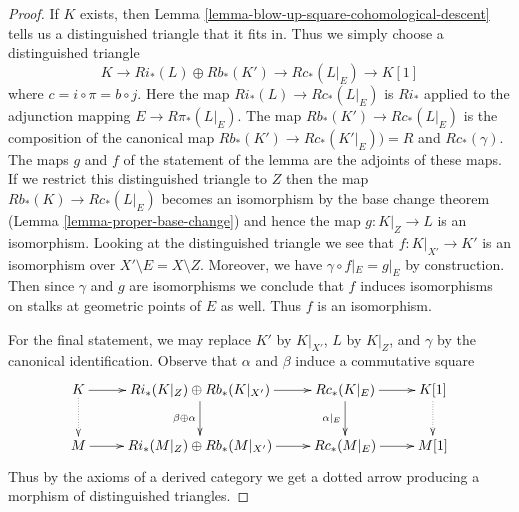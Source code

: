 \documentclass[10pt,a4paper]{amsart}
\theoremstyle{plain}
\theoremstyle{definition}
\theoremstyle{remark}
\numberwithin{equation}{subsection}
\begin{document}
\begin{proof}
If $K$ exists, then Lemma \ref{lemma-blow-up-square-cohomological-descent}
tells us a distinguished triangle that it fits in. Thus we simply choose
a distinguished triangle
$$
K \to Ri_*(L) \oplus Rb_*(K') \to Rc_*(L|_E) \to K[1]
$$
where $c = i \circ \pi = b \circ j$. Here the map $Ri_*(L) \to Rc_*(L|_E)$
is $Ri_*$ applied to the adjunction mapping $E \to R\pi_*(L|_E)$.
The map $Rb_*(K') \to Rc_*(L|_E)$ is the composition of the canonical map
$Rb_*(K') \to Rc_*(K'|_E)) = R$ and $Rc_*(\gamma)$.
The maps $g$ and $f$ of the statement of the lemma are the adjoints
of these maps. If we restrict this distinguished triangle to $Z$
then the map $Rb_*(K) \to Rc_*(L|_E)$ becomes an isomorphism
by the base change theorem (Lemma \ref{lemma-proper-base-change}) and hence
the map $g : K|_Z \to L$ is an isomorphism.
Looking at the distinguished triangle we see that $f : K|_{X'} \to K'$
is an isomorphism over $X' \setminus E = X \setminus Z$.
Moreover, we have $\gamma \circ f|_E = g|_E$ by construction.
Then since $\gamma$ and $g$ are isomorphisms we conclude
that $f$ induces isomorphisms on stalks at geometric points of $E$
as well. Thus $f$ is an isomorphism.

\medskip\noindent
For the final statement, we may replace $K'$ by $K|_{X'}$,
$L$ by $K|_Z$, and $\gamma$ by the canonical identification.
Observe that $\alpha$ and $\beta$ induce a commutative square
$$
\xymatrix{
K \ar[r] \ar@{..>}[d] &
Ri_*(K|_Z) \oplus Rb_*(K|_{X'}) \ar[r] \ar[d]_{\beta \oplus \alpha} &
Rc_*(K|_E) \ar[r] \ar[d]_{\alpha|_E} &
K[1] \ar@{..>}[d] \\
M \ar[r] &
Ri_*(M|_Z) \oplus Rb_*(M|_{X'}) \ar[r] &
Rc_*(M|_E) \ar[r] &
M[1]
}
$$
Thus by the axioms of a derived category we get a dotted
arrow producing a morphism of distinguished triangles.
\end{proof}
\end{document}
